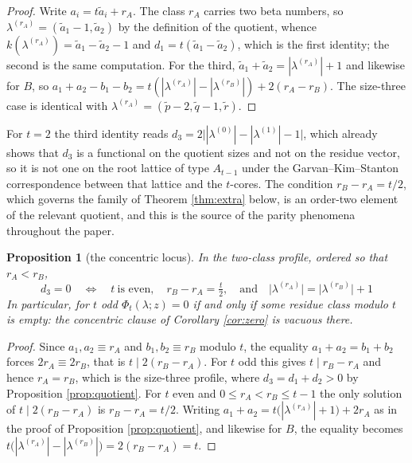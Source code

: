 \documentclass[11pt,reqno]{amsart}
\theoremstyle{plain}
\newtheorem{proposition}[theorem]{Proposition}
\theoremstyle{definition}
\begin{document}
\begin{proof}
Write $a_i=t\tilde a_i+r_A$. The class $r_A$ carries two beta numbers, so
$\lambda^{(r_A)}=(\tilde a_1-1,\tilde a_2)$ by the definition of the quotient, whence
$k(\lambda^{(r_A)})=\tilde a_1-\tilde a_2-1$ and $d_1=t(\tilde a_1-\tilde a_2)$, which is the first
identity; the second is the same computation. For the third,
$\tilde a_1+\tilde a_2=|\lambda^{(r_A)}|+1$ and likewise for $B$, so
$a_1+a_2-b_1-b_2=t(|\lambda^{(r_A)}|-|\lambda^{(r_B)}|)+2(r_A-r_B)$. The size-three case is
identical with $\lambda^{(r_A)}=(\tilde p-2,\tilde q-1,\tilde r)$.
\end{proof}

For $t=2$ the third identity reads $d_3=2\bigl||\lambda^{(0)}|-|\lambda^{(1)}|-1\bigr|$, which
already shows that $d_3$ is a functional on the quotient sizes and not on the residue vector, so it
is not one on the root lattice of type $A_{t-1}$ under the Garvan--Kim--Stanton correspondence
\cite{GKS90} between that lattice and the $t$-cores. The condition $r_B-r_A=t/2$, which
governs the family of Theorem \ref{thm:extra} below, is an order-two element of the relevant
quotient, and this is the source of the parity phenomena throughout the paper.

\begin{proposition}[the concentric locus]\label{rem:lattice}
In the two-class profile, ordered so that $r_A<r_B$,
\[
\boxed{\;\;d_3=0\quad\Longleftrightarrow\quad t\ \text{is even},\quad r_B-r_A=\tfrac t2,
\quad\text{and}\quad \bigl|\lambda^{(r_A)}\bigr|=\bigl|\lambda^{(r_B)}\bigr|+1\;\;}
\]
In particular, for $t$ odd $\Phi_t(\lambda;z)=0$ if and only if some residue class modulo $t$ is
empty: the concentric clause of Corollary \ref{cor:zero} is vacuous there.
\end{proposition}

\begin{proof}
Since $a_1,a_2\equiv r_A$ and $b_1,b_2\equiv r_B$ modulo $t$, the equality $a_1+a_2=b_1+b_2$ forces
$2r_A\equiv2r_B$, that is $t\mid2(r_B-r_A)$. For $t$ odd this gives $t\mid r_B-r_A$ and hence
$r_A=r_B$, which is the size-three profile, where $d_3=d_1+d_2>0$ by Proposition
\ref{prop:quotient}. For $t$ even and $0\le r_A<r_B\le t-1$ the only solution of $t\mid2(r_B-r_A)$
is $r_B-r_A=t/2$. Writing $a_1+a_2=t\bigl(|\lambda^{(r_A)}|+1\bigr)+2r_A$ as in the proof of
Proposition \ref{prop:quotient}, and likewise for $B$, the equality becomes
$t\bigl(|\lambda^{(r_A)}|-|\lambda^{(r_B)}|\bigr)=2(r_B-r_A)=t$.
\end{proof}
\end{document}
